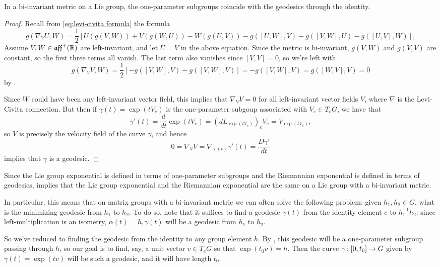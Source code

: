 \begin{theorem}\label{thm:bi-invariant exp}
	In a bi-invariant metric on a Lie group, the one-parameter subgroups coincide with the geodesics through the identity.
\end{theorem}

\begin{proof}
	Recall from \eqref{eq:levi-civita formula} the formula 
	\begin{equation*}
		g(\nabla_VU,W) = \frac{1}{2}\left[U(g(V,W)) + V(g(W,U)) - W(g(U,V)) - g([U,W],V) - g([V,W],U) - g([U,V],W)\right],
	\end{equation*}
	Assume $V,W \in \mathfrak{aff}^+(\mathbb{R})$ are left-invariant, and let $U=V$ in the above equation. Since the metric is bi-invariant, $g(V,W)$ and $g(V,V)$ are constant, so the first three terms all vanish. The last term also vanishes since $[V,V]=0$, so we're left with
	\[
		g(\nabla_VV,W) = \frac{1}{2}\left[- g([V,W],V) - g([V,W],V)\right] = -g([V,W],V) = g([W,V],V) = 0
	\]
	by .
	
	Since $W$ could have been any left-invariant vector field, this implies that $\nabla_VV = 0$ for all left-invariant vector fields $V$, where $\nabla$ is the Levi-Civita connection. But then if $\gamma(t) = \exp(tV_e)$ is the one-parameter subgoup associated with $V_e \in T_eG$, we have that
	\[
		\gamma'(t) = \frac{d}{dt} \exp(tV_e) = (d L_{\exp(tV_e)})_e V_e = V_{\exp(tV_e)},
	\]
	so $V$ is precisely the velocity field of the curve $\gamma$, and hence
	\[
		0 = \nabla_VV = \nabla_{\gamma'(t)} \gamma'(t) = \frac{D\gamma'}{dt}
	\]
	implies that $\gamma$ is a geodesic.
\end{proof}

Since the Lie group exponential is defined in terms of one-parameter subgroups and the Riemannian exponential is defined in terms of geodesics,  implies that the Lie group exponential and the Riemannian exponential are the same on a Lie group with a bi-invariant metric.


In particular, this means that on matrix groups with a bi-invariant metric we can often solve the following problem: given $h_1, h_2 \in G$, what is the minimizing geodesic from $h_1$ to $h_2$. To do so, note that it suffices to find a geodesic $\gamma(t)$ from the identity element $e$ to $h_1^{-1}h_2$: since left-multiplication is an isometry, $\alpha(t) = h_1 \gamma(t)$ will be a geodesic from $h_1$ to $h_2$. 

So we've reduced to finding the geodesic from the identity to any group element $h$. By , this geodesic will be a one-parameter subgroup passing through $h$, so our goal is to find, say, a unit vector $v \in T_e G$ so that $\exp(t_0v) = h$. Then the curve $\gamma \colon\thinspace\! [0,t_0] \to G$ given by $\gamma(t) = \exp(tv)$ will be such a geodesic, and it will have length $t_0$. 

